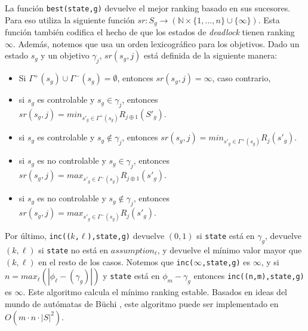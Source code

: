 La función \texttt{best(state,g)} devuelve el mejor ranking basado en sus sucesores. Para eso utiliza la siguiente
función $sr : S_g \rightarrow (\mathbb{N} \times \{1,...,n\} \cup \{\infty\})$. Esta función también codifica el hecho
de que los estados de \emph{deadlock} tienen ranking $\infty$. Además, notemos que usa un orden lexicográfico para los
objetivos. Dado un estado $s_g$ y un objetivo $\gamma_j$, $sr(s_g,j)$ está definida de la siguiente manera:

\begin{itemize}
\itemsep-4mm
\item Si $\Gamma^+(s_g) \cup \Gamma^-(s_g) = \emptyset$, entonces $sr(s_g,j) = \infty$, caso contrario,
\item si $s_g$ es controlable y $s_g \in \gamma_j$, entonces $sr(s_g,j) = min_{s'_g \in \Gamma^+(s_g)} R_{j \oplus
1}(S'_g)$.
\item si $s_g$ es controlable y $s_g \notin \gamma_j$, entonces $sr(s_g,j) = min_{s'_g \in \Gamma^+(s_g)} R_j(s'_g)$.
\item si $s_g$ es no controlable y $s_g \in \gamma_j$, entonces $sr(s_g,j) = max_{s'_g \in \Gamma^-(s_g)} R_{j \oplus
1}(s'_g)$.
\item si $s_g$ es no controlable y $s_g \notin \gamma_j$, entonces $sr(s_g,j) = max_{s'_g \in \Gamma^-(s_g)} R_j(s'_g)$.
\end{itemize}

Por último, \texttt{inc(($k$,$\ell$),state,g)} devuelve $(0,1)$ si \texttt{state} está en $\gamma_g$, devuelve $(k,\ell)$ si
\texttt{state} no está en \texttt{$assumption_\ell$}, y devuelve el mínimo valor mayor que $(k,\ell)$ en el resto de los
casos. Notemos que \texttt{inc($\infty$,state,g)} es $\infty$, y si $n = max_\ell(|\phi_\ell-(\gamma_g)|)$ y
\texttt{state} está en $\phi_m-\gamma_g$ entonces \texttt{inc((n,m),state,g)} es $\infty$. Este algoritmo calcula el
mínimo ranking estable. Basados en ideas del mundo de autómatas de Büchi \cite{doi:10.1137/S0097539703420675,
PitermanAndJuvekar}, este algoritmo puede ser implementado
en $O(m \cdot n \cdot |S|^2)$.
